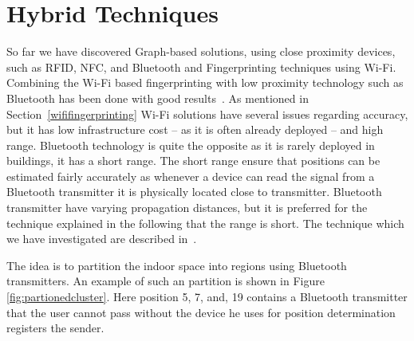 \section{Hybrid Techniques}
So far we have discovered Graph-based solutions, using close proximity devices, such as RFID, NFC, and Bluetooth and Fingerprinting techniques using Wi-Fi. 
Combining the Wi-Fi based fingerprinting with low proximity technology such as Bluetooth has been done with good results~\cite{6068444}.
As mentioned in Section~\ref{wififingerprinting} Wi-Fi solutions have several issues regarding accuracy, but it has low infrastructure cost -- as it is often already deployed -- and high range. 
Bluetooth technology is quite the opposite as it is rarely deployed in buildings, it has a short range. 
The short range ensure that positions can be estimated fairly accurately as whenever a device can read the signal from a Bluetooth transmitter it is physically located close to transmitter. 
Bluetooth transmitter have varying propagation distances, but it is preferred for the technique explained in the following that the range is short. 
The technique which we have investigated are described in~\cite{6068444}.

The idea is to partition the indoor space into regions using Bluetooth transmitters.
An example of such an partition is shown in Figure \ref{fig:partionedcluster}. 
Here position 5, 7, and, 19 contains a Bluetooth transmitter that the user cannot pass without the device he uses for position determination registers the sender.  


